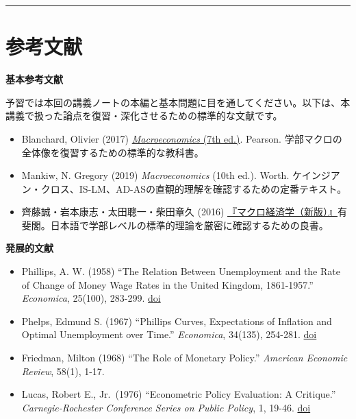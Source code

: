 \documentclass[
  japanese,
  lualatex,
  ja=standard,
  12pt,
  a4paper]{ltjsarticle}
\providecommand{\tightlist}{%
  \setlength{\itemsep}{0pt}\setlength{\parskip}{0pt}}
\begin{document}
\begin{center}\rule{0.5\linewidth}{0.5pt}\end{center}

\clearpage


\section{参考文献}\label{ux53c2ux8003ux6587ux732e}

\textbf{基本参考文献}

予習では本回の講義ノートの本編と基本問題に目を通してください。以下は、本講義で扱った論点を復習・深化させるための標準的な文献です。

\begin{itemize}
\tightlist
\item
  Blanchard, Olivier (2017)
  \href{https://www.pearson.com/en-us/subject-catalog/p/Blanchard-Macroeconomics-7th-Edition/P200000007659/9780133780581}{\emph{Macroeconomics}
  (7th ed.)}. Pearson.
  学部マクロの全体像を復習するための標準的な教科書。
\item
  Mankiw, N. Gregory (2019) \emph{Macroeconomics} (10th ed.). Worth.
  ケインジアン・クロス、IS-LM、AD-ASの直観的理解を確認するための定番テキスト。
\item
  齊藤誠・岩本康志・太田聰一・柴田章久 (2016)
  \href{https://www.yuhikaku.co.jp/books/detail/9784641053847}{『マクロ経済学（新版）』}有斐閣。日本語で学部レベルの標準的理論を厳密に確認するための良書。
\end{itemize}


\textbf{発展的文献}

\begin{itemize}
\tightlist
\item
  Phillips, A. W. (1958) ``The Relation Between Unemployment and the
  Rate of Change of Money Wage Rates in the United Kingdom, 1861-1957.''
  \emph{Economica}, 25(100), 283-299.
  \href{https://doi.org/10.1111/j.1468-0335.1958.tb00003.x}{doi}
\item
  Phelps, Edmund S. (1967) ``Phillips Curves, Expectations of Inflation
  and Optimal Unemployment over Time.'' \emph{Economica}, 34(135),
  254-281. \href{https://doi.org/10.2307/2552025}{doi}
\item
  Friedman, Milton (1968) ``The Role of Monetary Policy.''
  \emph{American Economic Review}, 58(1), 1-17.
\item
  Lucas, Robert E., Jr.~(1976) ``Econometric Policy Evaluation: A
  Critique.'' \emph{Carnegie-Rochester Conference Series on Public
  Policy}, 1, 19-46.
  \href{https://doi.org/10.1016/S0167-2231(76)80003-6}{doi}
\end{itemize}
\end{document}
